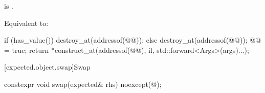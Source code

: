 \begin{itemdescr}
\pnum
\constraints
{}
is .

\pnum
\effects
Equivalent to:
\begin{codeblock}
if (has_value()) {
  destroy_at(addressof(@@));
} else {
  destroy_at(addressof(@@));
  @@ = true;
}
return *construct_at(addressof(@@), il, std::forward<Args>(args)...);
\end{codeblock}
\end{itemdescr}

[expected.object.swap]{Swap}

%
\begin{itemdecl}
constexpr void swap(expected& rhs) noexcept(@\seebelow@);
\end{itemdecl}


